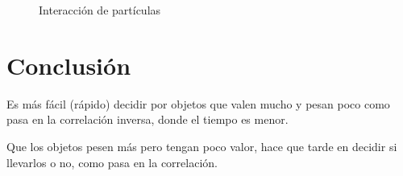 \documentclass{article}
\begin{document}
\begin{figure}[h!]
\centering
{}
\caption{Interacción de partículas}\label{fig2}
\end{figure}






\newpage
\section{Conclusión}

Es más fácil (rápido) decidir por objetos  que valen mucho y pesan poco como pasa en la correlación inversa, donde el tiempo es menor. \par
Que los objetos pesen más pero tengan poco valor, hace que tarde en decidir si llevarlos o no, como pasa en la correlación.


\newpage


\end{document}
